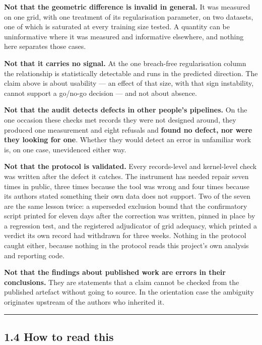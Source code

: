 \documentclass[
  10pt,
]{article}
\begin{document}
\textbf{Not that the geometric difference is invalid in general.} It was
measured on one grid, with one treatment of its regularisation
parameter, on two datasets, one of which is saturated at every training
size tested. A quantity can be uninformative where it was measured and
informative elsewhere, and nothing here separates those cases.

\textbf{Not that it carries no signal.} At the one breach-free
regularisation column the relationship is statistically detectable and
runs in the predicted direction. The claim above is about usability ---
an effect of that size, with that sign instability, cannot support a
go/no-go decision --- and not about absence.

\textbf{Not that the audit detects defects in other people's pipelines.}
On the one occasion these checks met records they were not designed
around, they produced one measurement and eight refusals and
\textbf{found no defect, nor were they looking for one}. Whether they
would detect an error in unfamiliar work is, on one case, unevidenced
either way.

\textbf{Not that the protocol is validated.} Every records-level and
kernel-level check was written after the defect it catches. The
instrument has needed repair seven times in public, three times because
the tool was wrong and four times because its authors stated something
their own data does not support. Two of the seven are the same lesson
twice: a superseded exclusion bound that the confirmatory script printed
for eleven days after the correction was written, pinned in place by a
regression test, and the registered adjudicator of grid adequacy, which
printed a verdict its own record had withdrawn for three weeks. Nothing
in the protocol caught either, because nothing in the protocol reads
this project's own analysis and reporting code.

\textbf{Not that the findings about published work are errors in their
conclusions.} They are statements that a claim cannot be checked from
the published artefact without going to source. In the orientation case
the ambiguity originates upstream of the authors who inherited it.

\begin{center}\rule{0.5\linewidth}{0.5pt}\end{center}

\subsection{1.4 How to read this}\label{how-to-read-this}
\end{document}
